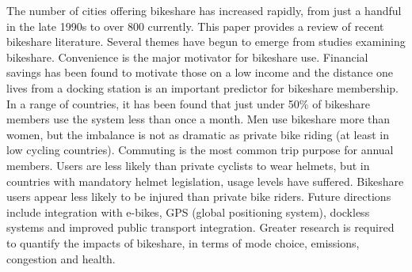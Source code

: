 The number of cities offering bikeshare has increased rapidly, from just a handful in the late 1990s to over 800 currently. This paper provides a review of recent bikeshare literature. Several themes have begun to emerge from studies examining bikeshare. Convenience is the major motivator for bikeshare use. Financial savings has been found to motivate those on a low income and the distance one lives from a docking station is an important predictor for bikeshare membership. In a range of countries, it has been found that just under 50\% of bikeshare members use the system less than once a month. Men use bikeshare more than women, but the imbalance is not as dramatic as private bike riding (at least in low cycling countries). Commuting is the most common trip purpose for annual members. Users are less likely than private cyclists to wear helmets, but in countries with mandatory helmet legislation, usage levels have suffered. Bikeshare users appear less likely to be injured than private bike riders. Future directions include integration with e-bikes, GPS (global positioning system), dockless systems and improved public transport integration. Greater research is required to quantify the impacts of bikeshare, in terms of mode choice, emissions, congestion and health. 
